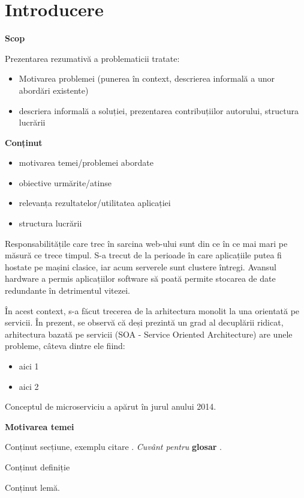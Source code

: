 \chapter{Introducere}

\textbf{Scop}

Prezentarea rezumativă a problematicii tratate:
\begin{itemize}
	\item Motivarea problemei (punerea în context, descrierea informală a unor abordări existente)
	\item descriera informală a soluției, prezentarea contribuțiilor autorului, structura lucrării
\end{itemize}
\textbf{Conținut}
\begin{itemize}
	\item motivarea temei/problemei abordate
	\item obiective urmărite/atinse
	\item relevanța rezultatelor/utilitatea aplicației
	\item structura lucrării
\end{itemize}
Responsabilitățile care trec în sarcina web-ului sunt din ce în ce mai mari pe măsură ce trece timpul. S-a trecut de la perioade în care aplicațiile putea fi hostate pe mașini clasice, iar acum serverele sunt clustere întregi. Avansul hardware a permis aplicațiilor software să poată permite stocarea de date redundante în detrimentul vitezei.

În acest context, s-a făcut trecerea de la arhitectura monolit la una orientată pe servicii. În prezent, se observă că deși prezintă un grad al decuplării ridicat, arhitectura bazată pe servicii (SOA - Service Oriented Architecture) are unele probleme, câteva dintre ele fiind:
\begin{itemize}
	\item aici 1
	\item aici 2
\end{itemize}

Conceptul de microserviciu a apărut în jurul anului 2014.

\textbf{Motivarea temei}


Conținut secțiune, exemplu citare \cite{hoare_csp}.
\textit{Cuvânt pentru} \textbf{glosar} .	

\begin{definition}
	Conținut definiție
\end{definition}


\begin{lemma}
	Conținut lemă.
\end{lemma}

